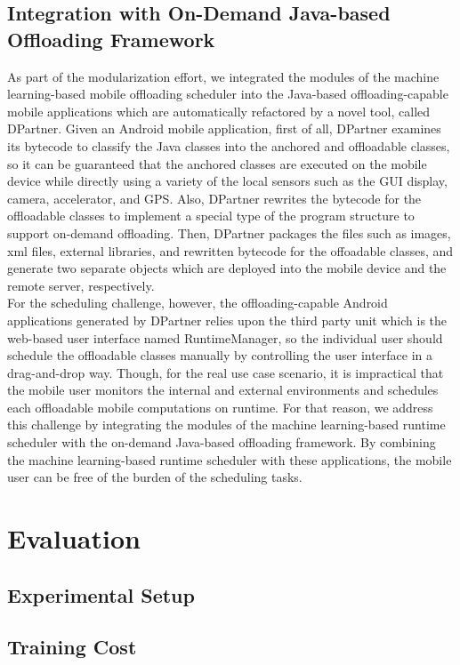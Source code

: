 \documentclass[10pt, conference, compsocconf]{IEEEtran}
\begin{document}
\subsection{Integration with On-Demand Java-based Offloading Framework}
%
As part of the modularization effort, we integrated the modules of the
machine learning-based mobile offloading scheduler into the Java-based
offloading-capable mobile applications which are automatically
refactored by a novel tool, called DPartner.
%
Given an Android mobile application, first of all, DPartner examines its
bytecode to classify the Java classes into the anchored and offloadable
classes, so it can be guaranteed that the anchored classes are executed
on the mobile device while directly using a variety of the local sensors
such as the GUI display, camera, accelerator, and GPS.
%
Also, DPartner rewrites the bytecode for the offloadable classes to
implement a special type of the program structure to support on-demand
offloading.
%
Then, DPartner packages the files such as images, xml files, external
libraries, and rewritten bytecode for the offoadable classes, and
generate two separate objects which are deployed into the mobile device
and the remote server, respectively.\\
%
\indent For the scheduling challenge, however, the offloading-capable
Android applications generated by DPartner relies upon the third party
unit which is the web-based user interface named RuntimeManager, so the
individual user should schedule the offloadable classes manually by
controlling the user interface in a drag-and-drop way. 
%
Though, for the real use case scenario, it is impractical that the
mobile user monitors the internal and external environments and
schedules each offloadable mobile computations on runtime.
%
For that reason, we address this challenge by integrating the modules of
the machine learning-based runtime scheduler with the on-demand
Java-based offloading framework.  
%
By combining the machine learning-based runtime scheduler with these
applications, the mobile user can be free of the burden of the scheduling
tasks.
%
\section{Evaluation}
%
\subsection{Experimental Setup}
%
\subsection{Training Cost}
%
\end{document}
